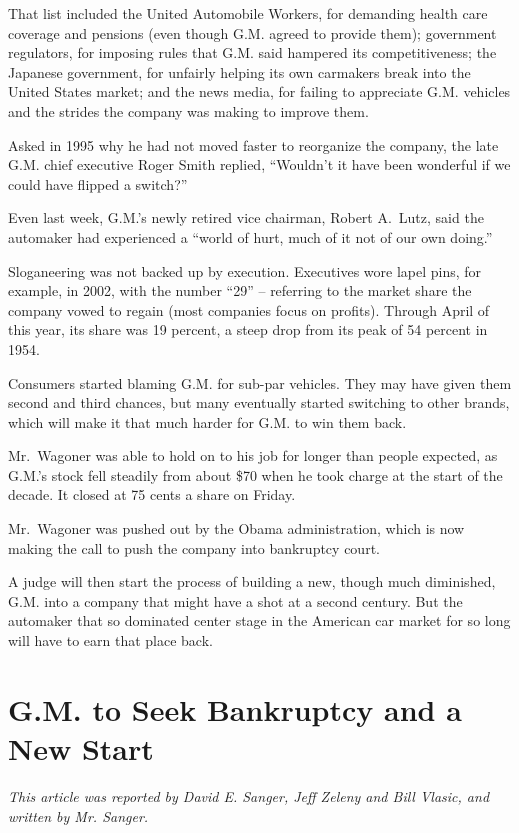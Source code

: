 \documentclass[12pt,a4paper,onecolumn]{article}
\begin{document}
That list included the United Automobile Workers, for demanding health care coverage and pensions
(even though G.M. agreed to provide them); government regulators, for imposing rules that G.M. said
hampered its competitiveness; the Japanese government, for unfairly helping its own carmakers break
into the United States market; and the news media, for failing to appreciate G.M. vehicles and the
strides the company was making to improve them.

Asked in 1995 why he had not moved faster to reorganize the company, the late G.M. chief executive
Roger Smith replied, ``Wouldn't it have been wonderful if we could have flipped a switch?''

Even last week, G.M.'s newly retired vice chairman, Robert A.~Lutz, said the automaker had
experienced a ``world of hurt, much of it not of our own doing.''

Sloganeering was not backed up by execution. Executives wore lapel pins, for example, in 2002, with
the number ``29'' -- referring to the market share the company vowed to regain (most companies focus
on profits). Through April of this year, its share was 19 percent, a steep drop from its peak of 54
percent in 1954.

Consumers started blaming G.M. for sub-par vehicles. They may have given them second and third
chances, but many eventually started switching to other brands, which will make it that much harder
for G.M. to win them back.

Mr.~Wagoner was able to hold on to his job for longer than people expected, as G.M.'s stock fell
steadily from about \$70 when he took charge at the start of the decade. It closed at 75 cents a
share on Friday.

Mr.~Wagoner was pushed out by the Obama administration, which is now making the call to push the
company into bankruptcy court.

A judge will then start the process of building a new, though much diminished, G.M. into a company
that might have a shot at a second century. But the automaker that so dominated center stage in the
American car market for so long will have to earn that place back.


\section{G.M. to Seek Bankruptcy and a New Start}

\textsl{This article was reported by David E. Sanger, Jeff Zeleny and Bill Vlasic, and written by
  Mr. Sanger.}
\end{document}
